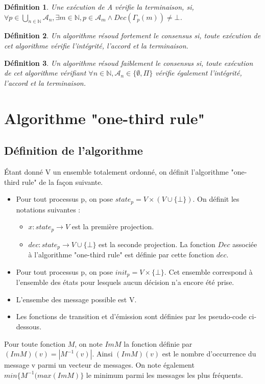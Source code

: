 \documentclass{article}
\newtheorem{definition}{Définition}
\begin{document}
\begin{definition}
	Une exécution de A vérifie la terminaison, si, $\forall p \in \bigcup\limits_{n \in \mathds{N}} \mathcal{A}_n, \exists m \in \mathds{N}, p \in \mathcal{A}_m \wedge Dec(\Gamma_p(m)) \neq \bot$.
\end{definition}

\begin{definition}
	Un algorithme résoud fortement le consensus si, toute exécution de cet algorithme vérifie l'intégrité, l'accord et la terminaison.
\end{definition}

\begin{definition}
	Un algorithme résoud faiblement le consensus si, toute exécution de cet algorithme vérifiant
	$\forall n \in \mathds{N}, \mathcal{A}_n \in \{\emptyset, \Pi\}$ vérifie également l'intégrité, l'accord et la terminaison.
\end{definition}

\section{Algorithme "one-third rule"}
\subsection{Définition de l'algorithme}

Étant donné V un ensemble totalement ordonné, on définit l'algorithme "one-third rule" de la façon suivante.
\begin{itemize}
	\item Pour tout processus p, on pose $state_p = V \times (V \cup \{ \bot \})$.
	On définit les notations suivantes :
	\begin{itemize}

		\item $x : state_p \rightarrow V$ est la première projection.
		\item $dec : state_p \rightarrow V \cup \{\bot\}$ est la seconde projection. La fonction $Dec$ associée à l'algorithme "one-third rule" est définie par cette fonction $dec$.

	\end{itemize}
\item Pour tout processus p, on pose $init_p = V \times \{ \bot \}$. Cet ensemble correspond à l'ensemble des états pour lesquels aucun décision n'a encore été prise.
\item L'ensembe des message possible est V. 
\item Les fonctions de transition et d'émission sont définies par les pseudo-code ci-dessous.
\end{itemize}
Pour toute fonction $M$, on note $Im M$ la fonction définie par $(Im M)(v) = |M^{-1}(v)|$. Ainsi $(Im M)(v)$ est le nombre d'occurrence du message v parmi un vecteur de messages.
On note également $min \{M^{-1} (max (Im M)\}$  le minimum parmi les messages les plus fréquents.
\end{document}

